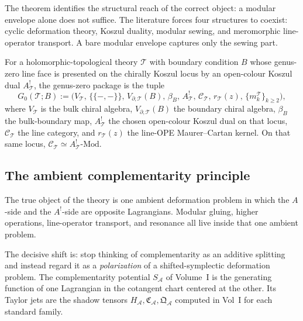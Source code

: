 \begin{remark}
The theorem identifies the structural reach of the correct object: a
modular envelope alone does not suffice. The literature forces four
structures to coexist: cyclic deformation theory, Koszul duality,
modular sewing, and meromorphic line-operator transport. A bare
modular envelope captures only the sewing part.
\end{remark}

\begin{definition}
\label{def:genus-zero-package}
For a holomorphic-topological theory $\mathcal{T}$ with boundary
condition $B$ whose genus-zero line face is presented on the
chirally Koszul locus by an open-colour Koszul dual
$A^!_{\mathcal{T}}$, the genus-zero package is the tuple
\begin{equation}
\label{eq:genus-zero-package}
G_0(\mathcal{T}; B)
:=
\bigl(
V_{\mathcal{T}},\,
\{\!\{-,-\}\!\},\,
V_{\partial,\mathcal{T}}(B),\,
\beta_B,\,
A^!_{\mathcal{T}},\,
\mathcal{C}_{\mathcal{T}},\,
r_{\mathcal{T}}(z),\,
\{m_k^{\mathcal{T}}\}_{k \geq 2}
\bigr),
\end{equation}
where $V_{\mathcal{T}}$ is the bulk chiral algebra,
$V_{\partial,\mathcal{T}}(B)$ the boundary chiral algebra,
$\beta_B$ the bulk-boundary map, $A^!_{\mathcal{T}}$ the chosen
open-colour Koszul dual on that locus,
$\mathcal{C}_{\mathcal{T}}$ the line category, and
$r_{\mathcal{T}}(z)$ the line-OPE Maurer--Cartan kernel. On that
same locus,
$\mathcal{C}_{\mathcal{T}} \simeq A^!_{\mathcal{T}}\text{-Mod}$.
\end{definition}

\subsection{The ambient complementarity principle}
\label{subsec:ambient-complementarity-principle}

\begin{principle}
\label{princ:ambient-complementarity}
The true object of the theory is one ambient deformation problem in
which the $A$-side and the $A^!$-side are opposite Lagrangians.
Modular gluing, higher operations, line-operator transport, and
resonance all live inside that one ambient problem.
\end{principle}

The decisive shift is: stop thinking of complementarity as an
additive splitting and instead regard it as a \emph{polarization}
of a shifted-symplectic deformation problem. The complementarity
potential $S_{\mathcal{A}}$
of Volume~I is the
generating function of one Lagrangian in the cotangent chart
centered at the other. Its Taylor jets are the shadow tensors
$H_{\mathcal{A}}, \mathfrak{C}_{\mathcal{A}},
\mathfrak{Q}_{\mathcal{A}}$ computed in
Vol~I for each standard family.

